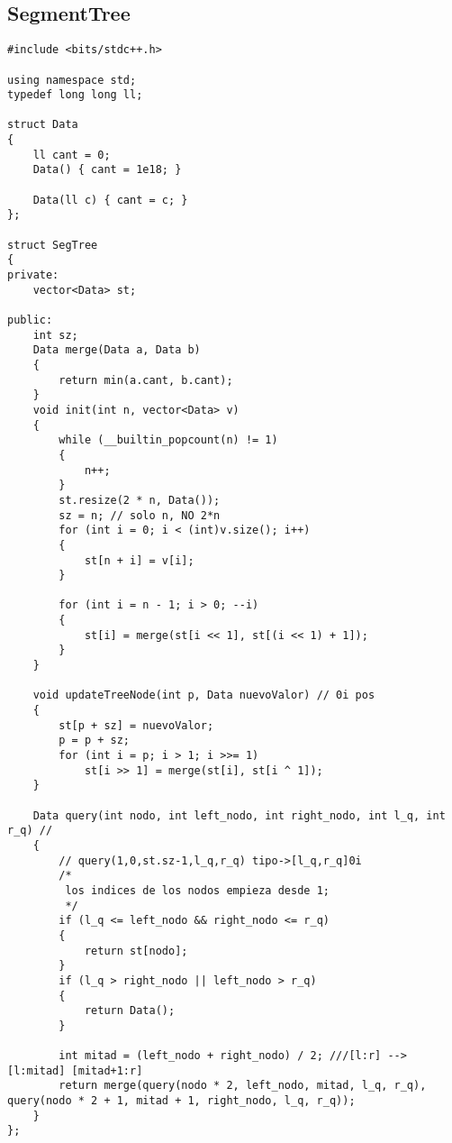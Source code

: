 \subsection*{SegmentTree}
\begin{lstlisting}
#include <bits/stdc++.h>

using namespace std;
typedef long long ll;

struct Data
{
    ll cant = 0;
    Data() { cant = 1e18; }

    Data(ll c) { cant = c; }
};

struct SegTree
{
private:
    vector<Data> st;

public:
    int sz;
    Data merge(Data a, Data b)
    {
        return min(a.cant, b.cant);
    }
    void init(int n, vector<Data> v)
    {
        while (__builtin_popcount(n) != 1)
        {
            n++;
        }
        st.resize(2 * n, Data());
        sz = n; // solo n, NO 2*n
        for (int i = 0; i < (int)v.size(); i++)
        {
            st[n + i] = v[i];
        }

        for (int i = n - 1; i > 0; --i)
        {
            st[i] = merge(st[i << 1], st[(i << 1) + 1]);
        }
    }

    void updateTreeNode(int p, Data nuevoValor) // 0i pos
    {
        st[p + sz] = nuevoValor;
        p = p + sz;
        for (int i = p; i > 1; i >>= 1)
            st[i >> 1] = merge(st[i], st[i ^ 1]);
    }

    Data query(int nodo, int left_nodo, int right_nodo, int l_q, int r_q) //
    {
        // query(1,0,st.sz-1,l_q,r_q) tipo->[l_q,r_q]0i
        /*
         los indices de los nodos empieza desde 1;
         */
        if (l_q <= left_nodo && right_nodo <= r_q)
        {
            return st[nodo];
        }
        if (l_q > right_nodo || left_nodo > r_q)
        {
            return Data();
        }

        int mitad = (left_nodo + right_nodo) / 2; ///[l:r] --> [l:mitad] [mitad+1:r]
        return merge(query(nodo * 2, left_nodo, mitad, l_q, r_q), query(nodo * 2 + 1, mitad + 1, right_nodo, l_q, r_q));
    }
};
\end{lstlisting}

